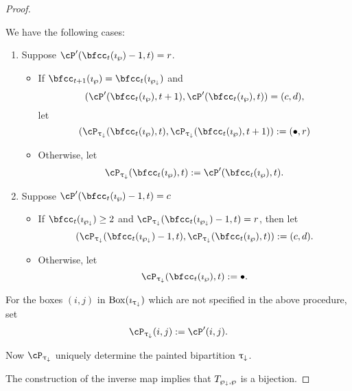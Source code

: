 \documentclass[12pt,a4paper]{amsart}
\numberwithin{equation}{section}
\theoremstyle{remark}
\def\BOX#1{\mathrm{Box}(#1)}
\begin{document}
{\begin{proof}
{\begin{description}
           \def\xxn{\cP_{\uptaum}(\bfcc_t(\imath_{\PPm})-1,t)} %
           \def\xxo{\cP_{\uptaum}(\bfcc_t(\imath_{\wp}),t)} %
           \def\xxd{\cP_{\uptaum}(\bfcc_t(\imath_{\wp}),t+1)} %
           \def\yyn{\cP'(\bfcc_t(\imath_{\PPm})-1,t)} %
           \def\yyo{\cP'(\bfcc_t(\imath_{\wp})-1,t)} %
           \def\yyt{\cP'(\bfcc_t(\imath_{\wp}),t)} %
           \def\yyd{\cP'(\bfcc_t(\imath_{\wp}),t+1)} %
           We have the following cases:
           \begin{enumerate}[label=(\alph*)]
             \item Suppose $\yyo=r$.
             \begin{itemize}
               \item If $\bfcc_{t+1}(\imath_{\wp}) = \bfcc_{t}(\imath_{\PPm})$
               and
               \[
                 (\yyd,\yyt) = (c,d),
               \]
               let
               \[
                 (\xxo,\xxd):=(\bullet, r)
               \]
               \item Otherwise, let \[
                 \xxo:=\yyt.
               \]
             \end{itemize}
             \item Suppose $\yyo=c$
             \begin{itemize}
               \item If $\bfcc_{t}(\imath_{\PPm})\geq 2$ and $\xxn=r$,
               then let
               \[
                 (\xxn,\xxo):=(c,d).
               \]
               \item Otherwise, let
               \[
                 \xxo :=\bullet.
               \]
             \end{itemize}
           \end{enumerate}
           For the boxes $(i,j)$ in $\BOX{\imath_{\uptaum}}$ which are not specified
           in the above procedure, set
           \[
           \cP_{\uptaum}(i,j):=\cP'(i,j).
           \]
     \item[STEP 3]
           Now $\cP_{\uptaum}$ uniquely determine the painted bipartition
           $\uptau_{\downarrow}$.
   \end{description}
   The construction of the inverse map implies that $T_{\wp_{\downarrow},\wp}$ is a
   bijection.
 }

  \def\ckcOa{\ckcO^{\uparrow}}
  \def\PPa{\wp^{\uparrow}}
  \def\PPam{\wp^{\uparrow}_{\downarrow}}
  \def\uptaua{\uptau^{\uparrow}}
  \def\tauPPa{\tau_{\PPa}}
  \def\tauPPam{\tau_{\PPam}}
  \def\stara{\star^{\uparrow}}


\end{proof}}
\end{document}
